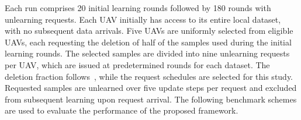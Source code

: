 Each run comprises 20 initial learning rounds followed by 180 rounds
with unlearning requests. Each UAV initially has access to its entire
local dataset, with no subsequent data arrivals. Five UAVs are uniformly
selected from eligible UAVs, each requesting the deletion of half of
the samples used during the initial learning rounds. The selected
samples are divided into nine unlearning requests per UAV, which are
issued at predetermined rounds for each dataset.
The deletion fraction follows~\cite{Mora_TBD_2026}, while the request
schedules are selected for this study. Requested samples are unlearned
over five update steps per request and excluded from subsequent learning
upon request arrival.
The following benchmark schemes are used to evaluate the performance
of the proposed framework.
